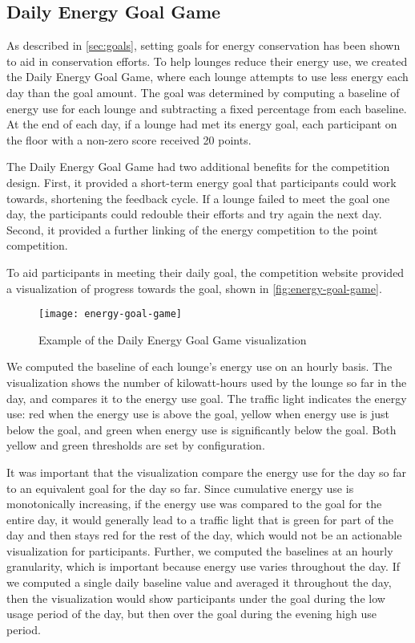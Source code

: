 \subsection{Daily Energy Goal Game}
\label{sec:energy-goal-game}

As described in \autoref{sec:goals}, setting goals for energy conservation has been shown to aid in conservation efforts. To help lounges reduce their energy use, we created the Daily Energy Goal Game, where each lounge attempts to use less energy each day than the goal amount. The goal was determined by computing a baseline of energy use for each lounge and subtracting a fixed percentage from each baseline. At the end of each day, if a lounge had met its energy goal, each participant on the floor with a non-zero score received 20 points.

The Daily Energy Goal Game had two additional benefits for the competition design. First, it provided a short-term energy goal that participants could work towards, shortening the feedback cycle. If a lounge failed to meet the goal one day, the participants could redouble their efforts and try again the next day. Second, it provided a further linking of the energy competition to the point competition.

To aid participants in meeting their daily goal, the competition website provided a visualization of progress towards the goal, shown in \autoref{fig:energy-goal-game}.

\begin{figure}[htbp]
	\centering
		\texttt{[image: energy-goal-game]}
		\caption{Example of the Daily Energy Goal Game visualization}
\label{fig:energy-goal-game}
\end{figure}

We computed the baseline of each lounge's energy use on an hourly basis. The visualization shows the number of kilowatt-hours used by the lounge so far in the day, and compares it to the energy use goal. The traffic light indicates the energy use: red when the energy use is above the goal, yellow when energy use is just below the goal, and green when energy use is significantly below the goal. Both yellow and green thresholds are set by configuration.

It was important that the visualization compare the energy use for the day so far to an equivalent goal for the day so far. Since cumulative energy use is monotonically increasing, if the energy use was compared to the goal for the entire day, it would generally lead to a traffic light that is green for part of the day and then stays red for the rest of the day, which would not be an actionable visualization for participants. Further, we computed the baselines at an hourly granularity, which is important because energy use varies throughout the day. If we computed a single daily baseline value and averaged it throughout the day, then the visualization would show participants under the goal during the low usage period of the day, but then over the goal during the evening high use period.


